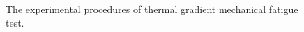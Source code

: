 \begin{figure}[!htp]
\caption{The experimental procedures of thermal gradient mechanical fatigue test.}
\label{Fig:tgmf_code}
\end{figure}


